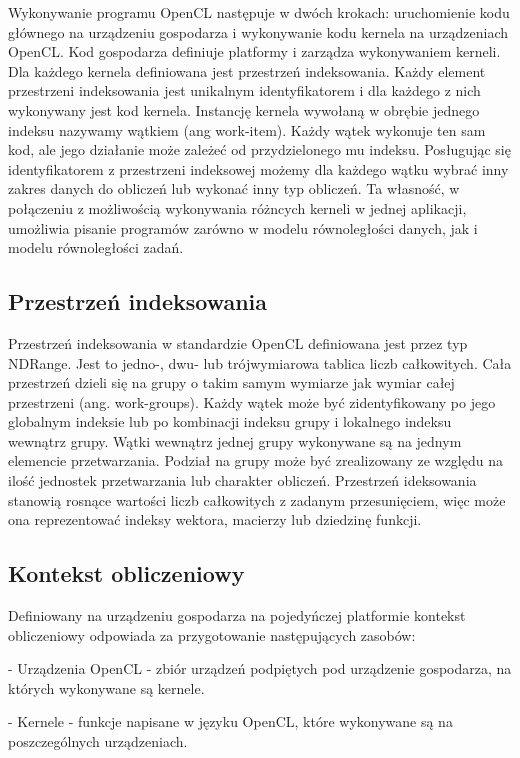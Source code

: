 Wykonywanie programu OpenCL następuje w dwóch krokach: uruchomienie kodu głównego na urządzeniu gospodarza i wykonywanie kodu kernela na urządzeniach OpenCL. Kod gospodarza definiuje platformy i zarządza wykonywaniem kerneli. Dla każdego kernela definiowana jest przestrzeń indeksowania. Każdy element przestrzeni indeksowania jest unikalnym identyfikatorem i dla każdego z nich wykonywany jest kod kernela. Instancję kernela wywołaną w obrębie jednego indeksu nazywamy wątkiem (ang work-item). Każdy wątek wykonuje ten sam kod, ale jego działanie może zależeć od przydzielonego mu indeksu. Posługując się identyfikatorem z przestrzeni indeksowej możemy dla każdego wątku wybrać inny zakres danych do obliczeń lub wykonać inny typ obliczeń. Ta własność, w połączeniu z możliwością wykonywania różncych kerneli w jednej aplikacji, umożliwia pisanie programów zarówno w modelu równoległości danych, jak i modelu równoległości zadań.

\subsection{Przestrzeń indeksowania}\label{sec:OpenC5L}

Przestrzeń indeksowania w standardzie OpenCL definiowana jest przez typ NDRange. Jest to jedno-, dwu- lub trójwymiarowa tablica liczb całkowitych. Cała przestrzeń dzieli się na grupy o takim samym wymiarze jak wymiar całej przestrzeni (ang. work-groups). Każdy wątek może być zidentyfikowany po jego globalnym indeksie lub po kombinacji indeksu grupy i lokalnego indeksu wewnątrz grupy. Wątki wewnątrz jednej grupy wykonywane są na jednym elemencie przetwarzania. Podział na grupy może być zrealizowany ze względu na ilość jednostek przetwarzania lub charakter obliczeń. Przestrzeń ideksowania stanowią rosnące wartości liczb całkowitych z zadanym przesunięciem, więc może ona reprezentować indeksy wektora, macierzy lub dziedzinę funkcji.

\subsection{Kontekst obliczeniowy}\label{sec:OpenC2L}

Definiowany na urządzeniu gospodarza na pojedyńczej platformie kontekst obliczeniowy odpowiada za przygotowanie następujących zasobów:

- Urządzenia OpenCL - zbiór urządzeń podpiętych pod urządzenie gospodarza, na których wykonywane są kernele.

- Kernele - funkcje napisane w języku OpenCL, które wykonywane są na poszczególnych urządzeniach.


